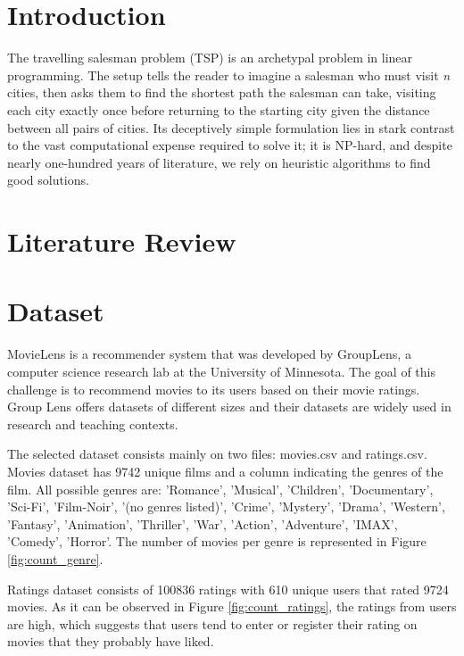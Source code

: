 \documentclass[12pt]{article}
\numberwithin{equation}{section}
\begin{document}
\newpage

\section{Introduction}

The travelling salesman problem (TSP) is an archetypal problem in linear programming. The setup tells the reader to imagine a salesman who must visit \textit{n} cities, then asks them to find the shortest path the salesman can take, visiting each city exactly once before returning to the starting city given the distance between all pairs of cities. Its deceptively simple formulation lies in stark contrast to the vast computational expense required to solve it; it is NP-hard, and despite nearly one-hundred years of literature, we rely on heuristic algorithms to find good solutions. 

\section{Literature Review}

\section{Dataset}

MovieLens is a recommender system that was developed by GroupLens, a computer science research lab at the University of Minnesota. The goal of this challenge is to recommend movies to its users based on their movie ratings. Group Lens offers datasets of different sizes and their datasets are widely used in research and teaching contexts.

The selected dataset consists mainly on two files: movies.csv and ratings.csv. Movies dataset has 9742 unique films and a column indicating the genres of the film. All possible genres are: 'Romance', 'Musical', 'Children', 'Documentary', 'Sci-Fi', 'Film-Noir', '(no genres listed)', 'Crime', 'Mystery', 'Drama', 'Western', 'Fantasy', 'Animation', 'Thriller', 'War', 'Action', 'Adventure', 'IMAX', 'Comedy', 'Horror'. The number of movies per genre is represented in Figure \ref{fig:count_genre}.

Ratings dataset consists of 100836 ratings with 610 unique users that rated 9724 movies. As it can be observed in Figure \ref{fig:count_ratings}, the ratings from users are high, which suggests that users tend to enter or register their rating on movies that they probably have liked. 

\begin{figure}[h!]
 \end{figure}
\end{document}
